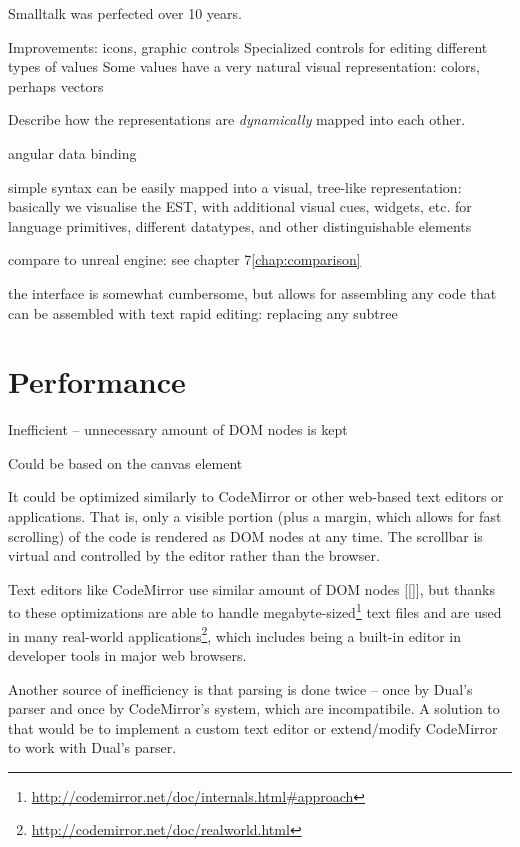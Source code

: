 Smalltalk was perfected over 10 years.

Improvements:
icons, graphic controls
Specialized controls for editing different types of values
Some values have a very natural visual representation:
colors, perhaps vectors



Describe how the representations are \textit{dynamically} mapped into each other. 

angular
data binding

simple syntax can be easily mapped into a visual, tree-like representation:
basically we visualise the EST, with additional visual cues, widgets, etc. for language primitives, different datatypes, and other distinguishable elements

compare to unreal engine:
see chapter 7\ref{chap:comparison}

the interface is somewhat cumbersome, but allows for assembling any code that can be assembled with text
rapid editing: replacing any subtree

\section{Performance}

Inefficient -- unnecessary amount of DOM nodes is kept

Could be based on the canvas element

It could be optimized similarly to CodeMirror or other web-based text editors or applications. That is, only a visible portion (plus a margin, which allows for fast scrolling) of the code is rendered as DOM nodes at any time. The scrollbar is virtual and controlled by the editor rather than the browser.

Text editors like CodeMirror use similar amount of DOM nodes [[]], but thanks to these optimizations are able to handle megabyte-sized\footnote{\url{http://codemirror.net/doc/internals.html\#approach}} text files and are used in many real-world applications\footnote{\url{http://codemirror.net/doc/realworld.html}}, which includes being a built-in editor in developer tools in major web browsers.

Another source of inefficiency is that parsing is done twice -- once by Dual's parser and once by CodeMirror's system, which are incompatibile.
A solution to that would be to implement a custom text editor or extend/modify CodeMirror to work with Dual's parser.



